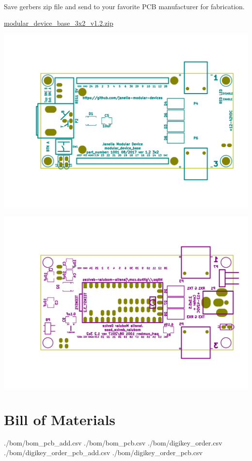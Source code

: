 \documentclass[11pt]{article}
\begin{document}
Save gerbers zip file and send to your favorite PCB manufacturer for
fabrication.

\href{./gerbers/modular\_device\_base\_3x2\_v1.2.zip}{modular\_device\_base\_3x2\_v1.2.zip}


\begin{center}
\includegraphics[width=.9\linewidth]{./gerbers/images/gerbers00.png}
\end{center}

\begin{center}
\includegraphics[width=.9\linewidth]{./gerbers/images/gerbers01.png}
\end{center}


\section{Bill of Materials}
\label{sec:orgf85580f}

./bom/bom\_pcb\_add.csv
./bom/bom\_pcb.csv
./bom/digikey\_order.csv
./bom/digikey\_order\_pcb\_add.csv
./bom/digikey\_order\_pcb.csv
\end{document}
